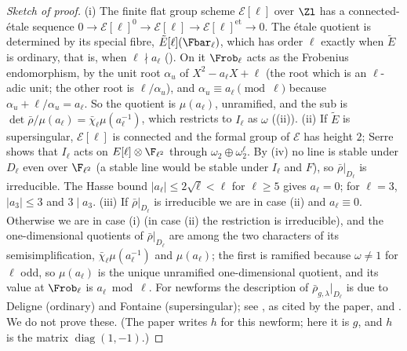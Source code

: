 \begin{proof}[Sketch of proof]
(i) The finite flat group scheme $\mathcal E[\ell]$ over $\Zl$ has a connected-\'etale sequence $0\to\mathcal E[\ell]^0\to\mathcal E[\ell]\to\mathcal E[\ell]^{\mathrm{et}}\to0$. The
\'etale quotient is determined by its special fibre, $\tilde E[\ell](\Fbar_\ell)$, which has order $\ell$ exactly when $\tilde E$ is ordinary, that is, when
$\ell\nmid a_\ell$ (). On it $\Frob_\ell$ acts as the Frobenius endomorphism, by the unit root $\alpha_u$ of $X^2-a_\ell X+\ell$ (the root which is
an $\ell$-adic unit; the other root is $\ell/\alpha_u$), and $\alpha_u\equiv a_\ell\pmod\ell$ because $\alpha_u+\ell/\alpha_u=a_\ell$. So the quotient is $\mu(a_\ell)$, unramified, and the
sub is $\det\bar\rho/\mu(a_\ell)=\bar\chi_\ell\mu(a_\ell^{-1})$, which restricts to $I_\ell$ as $\omega$ ((ii)). (ii) If $\tilde E$ is
supersingular, $\mathcal E[\ell]$ is connected and the formal group of $\mathcal E$ has height $2$; Serre \cite[Section 1]{Serre72} shows that $I_\ell$ acts on
$E[\ell]\otimes\F_{\ell^2}$ through $\omega_2\oplus\omega_2^\ell$. By (iv) no line is stable under $D_\ell$ even over $\F_{\ell^2}$ (a
stable line would be stable under $I_\ell$ and $F$), so $\bar\rho|_{D_\ell}$ is irreducible. The Hasse bound $|a_\ell|\le2\sqrt\ell<\ell$ for $\ell\ge5$ gives $a_\ell=0$; for
$\ell=3$, $|a_3|\le3$ and $3\mid a_3$. (iii) If $\bar\rho|_{D_\ell}$ is irreducible we are in case (ii) and $a_\ell\equiv0$. Otherwise we are in case (i) (in case (ii)
the restriction is irreducible), and the one-dimensional quotients of $\bar\rho|_{D_\ell}$ are among the two characters of its semisimplification,
$\bar\chi_\ell\mu(a_\ell^{-1})$ and $\mu(a_\ell)$; the first is ramified because $\omega\ne1$ for $\ell$ odd, so $\mu(a_\ell)$ is the unique unramified one-dimensional
quotient, and its value at $\Frob_\ell$ is $a_\ell\bmod\ell$. For newforms the description of $\bar\rho_{g,\lambda}|_{D_\ell}$ is due to Deligne (ordinary) and Fontaine
(supersingular); see \cite[Section 2]{Edixhoven92}, as cited by the paper, and . We do not prove these. (The paper writes $h$ for this
newform; here it is $g$, and $h$ is the matrix $\operatorname{diag}(1,-1)$.)
\end{proof}

